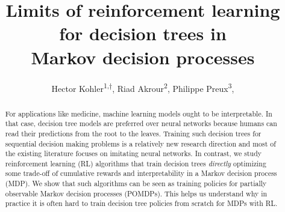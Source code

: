\documentclass[10pt]{article} %
\title{Limits of reinforcement learning for decision trees in\\ Markov decision processes}
\author{Hector Kohler\textsuperscript{1,$\dagger$},
Riad Akrour\textsuperscript{2},
Philippe Preux\textsuperscript{3},}
\theoremstyle{definition}
\begin{document}
\makeCover  %
\maketitle  %

\begin{abstract}
For applications like medicine, machine learning models ought to be interpretable.
In that case, decision tree models are preferred over neural networks because humans can read their predictions from the root to the leaves.
Training such decision trees for sequential decision making problems is a relatively new research direction and most of the existing literature focuses on imitating neural networks.
In contrast, we study reinforcement learning (RL) algorithms that train decision trees \textit{directly} optimizing some trade-off of cumulative rewards and interpretability in a Markov decision process (MDP). 
We show that such algorithms can be seen as training policies for partially observable Markov decision processes (POMDPs).
This helps us understand why in practice it is often hard to train decision tree policies from scratch for MDPs with RL.
\end{abstract}






\end{document}
